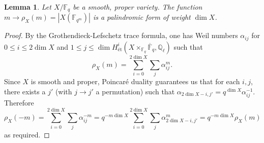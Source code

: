 \documentclass[10pt]{article}
\theoremstyle{plain}
\newtheorem{lemma}[theorem]{Lemma}
\theoremstyle{definition}
\numberwithin{equation}{section}
\begin{document}
\begin{lemma}\label{lemma: point counts have right weight}
Let $X/\mathbb F_q$ be a smooth, proper variety. The function $m \to \rho_X(m) = |X(\mathbb F_{q^m})|$ is a palindromic form of weight $\dim X$.
\end{lemma}
\begin{proof}
By the Grothendieck-Lefschetz trace formula, one has Weil numbers $\alpha_{ij}$ for $0 \leq i \leq 2\dim X$ and $1 \leq j \leq \dim H^i_{\text{\'et}}(X\times_{\mathbb F_q}\overline{\mathbb F}_q,\mathbb Q_\ell)$ such that
\[\rho_X(m) = \sum_{i=0}^{2\dim X}\sum_{j}\alpha_{ij}^m.\]
Since $X$ is smooth and proper, Poincar\'e duality guarantees us that for each $i,j$, there exists a $j'$ (with $j \to j'$ a permutation) such that $\alpha_{2\dim X-i,j'} = q^{\dim X}\alpha_{ij}^{-1}$. Therefore
\[\rho_X(-m) = \sum_{i=0}^{2\dim X}\sum_{j}\alpha_{ij}^{-m} = q^{-m\dim X}\sum_{i=0}^{2\dim X}\sum_{j}\alpha_{2\dim X-i,j'}^m = q^{-m\dim X}\rho_X(m)\]
as required.
\end{proof}
\end{document}
